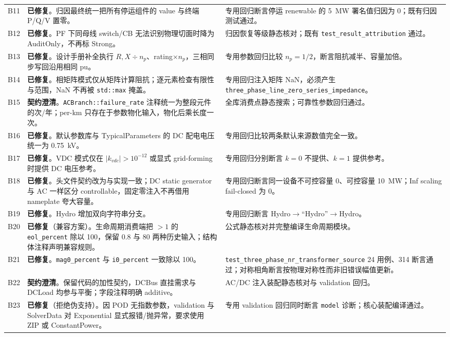 \documentclass[11pt,a4paper,fontset=fandol]{ctexart}
\newcommand{\file}[1]{\texttt{#1}}
\newcommand{\fixed}{\textcolor{hygreen}{\textbf{已修复}}}
\newcommand{\clarified}{\textcolor{hyblue}{\textbf{契约澄清}}}
\begin{document}
\begin{footnotesize}
\begin{longtable}{@{}p{0.7cm}p{8.4cm}p{6.0cm}@{}}
B11 & \fixed{}。归因最终统一把所有停运组件的 value 与终端 P/Q/V 置零。 & 专用回归断言停运 renewable 的 5~MW 署名值归因为 0；既有归因测试通过。\\
B12 & \fixed{}。PF 下同母线 switch/CB 无法识别物理切面时降为 AuditOnly，不再标 Strong。 & 归因恢复等级静态核对；既有 \file{test\_result\_attribution} 通过。\\
B13 & \fixed{}。设计手册补全执行 $R,X\div n_p$、rating$\times n_p$，三相同步写回沿用相同 pu。 & 专用参数回归比较 $n_p=1/2$，断言阻抗减半、容量加倍。\\
B14 & \fixed{}。相矩阵模式仅从矩阵计算阻抗；逐元素检查有限性与范围，NaN 不再被 \file{std::max} 掩盖。 & 专用回归注入矩阵 NaN，必须产生 \file{three\_phase\_line\_zero\_}\newline\file{series\_impedance}。\\
B15 & \clarified{}。\file{ACBranch::failure\_rate} 注释统一为整段元件的次/年；per-km 只存在于参数物化输入，物化后乘长度一次。 & 全库消费点静态搜索；可靠性参数回归通过。\\
B16 & \fixed{}。默认参数库与 TypicalParameters 的 DC 配电电压统一为 0.75~kV。 & 专用回归比较两条默认来源数值完全一致。\\
B17 & \fixed{}。VDC 模式仅在 $|k_{vdc}|>10^{-12}$ 或显式 grid-forming 时提供 DC 电压参考。 & 专用回归分别断言 $k=0$ 不提供、$k=1$ 提供参考。\\
B18 & \fixed{}。头文件契约改为与实现一致；DC static generator 与 AC 一样区分 controllable，固定零注入不再借用 nameplate 夸大容量。 & 专用回归断言同一设备不可控容量 0、可控容量 10~MW；Inf scaling fail-closed 为 0。\\
B19 & \fixed{}。Hydro 增加双向字符串分支。 & 专用回归断言 Hydro$\to$``Hydro''$\to$Hydro。\\
B20 & \fixed{}（兼容方案）。生命周期消费端把 $>1$ 的 \file{eol\_percent} 除以 100，保留 0.8 与 80 两种历史输入；结构体注释声明兼容规则。 & 公式静态核对并完整编译生命周期模块。\\
B21 & \fixed{}。\file{mag0\_percent} 与 \file{i0\_percent} 一致除以 100。 & \file{test\_three\_phase\_nr\_}\newline\file{transformer\_source} 24 用例、314 断言通过；对称相角断言按物理对称性而非旧错误幅值更新。\\
B22 & \clarified{}。保留代码的加性契约，DCBus 直挂需求与 DCLoad 均参与平衡；字段注释明确 additive。 & AC/DC 注入装配静态核对与 validation 回归。\\
B23 & \fixed{}（拒绝伪支持）。因 POD 无指数参数，validation 与 SolverData 对 Exponential 显式报错/抛异常，要求使用 ZIP 或 ConstantPower。 & 专用 validation 回归同时断言 \file{model} 诊断；核心装配编译通过。\\

\end{longtable}
\end{footnotesize}
\end{document}
